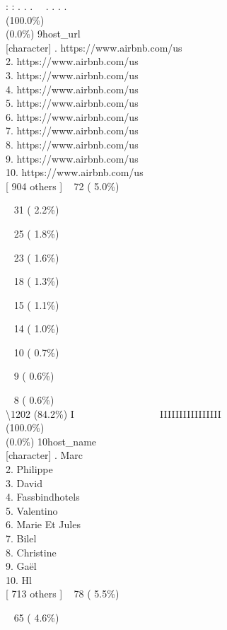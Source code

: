 \documentclass[
  journal,
]{IEEEtran}%
\begin{document}
: : . . . ~~. . . . \\
(100.0\%) \\
(0.0\%) \textbar{} \textbar{} 9\textbar host\_url\\
{[}character{]} . https://www.airbnb.com/us\\
2. https://www.airbnb.com/us\\
3. https://www.airbnb.com/us\\
4. https://www.airbnb.com/us\\
5. https://www.airbnb.com/us\\
6. https://www.airbnb.com/us\\
7. https://www.airbnb.com/us\\
8. https://www.airbnb.com/us\\
9. https://www.airbnb.com/us\\
10. https://www.airbnb.com/us\\
{[} 904 others {]} \textbar~ 72 ( 5.0\%)\\
\strut ~ 31 ( 2.2\%)\\
\strut ~ 25 ( 1.8\%)\\
\strut ~ 23 ( 1.6\%)\\
\strut ~ 18 ( 1.3\%)\\
\strut ~ 15 ( 1.1\%)\\
\strut ~ 14 ( 1.0\%)\\
\strut ~ 10 ( 0.7\%)\\
\strut ~ 9 ( 0.6\%)\\
\strut ~ 8 ( 0.6\%)\\
\textbackslash1202 (84.2\%) \textbar{} \textbar I ~ ~ ~ ~ ~ ~ ~ ~ ~ ~
IIIIIIIIIIIIIIII \\
(100.0\%) \\
(0.0\%) \textbar{} \textbar{} 10\textbar host\_name\\
{[}character{]} . Marc\\
2. Philippe\\
3. David\\
4. Fassbindhotels\\
5. Valentino\\
6. Marie Et Jules\\
7. Bilel\\
8. Christine\\
9. Gaël\\
10. Hl\\
{[} 713 others {]} \textbar~ 78 ( 5.5\%)\\
\strut ~ 65 ( 4.6\%)\\
\end{document}
